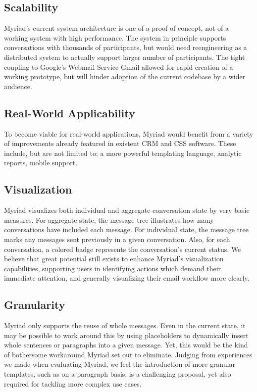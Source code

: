\subsection{Scalability}

Myriad’s current system architecture is one of a proof of concept, not of a working system with high performance. The system in principle supports conversations with thousands of participants, but would need reengineering as a distributed system to actually support larger number of participants.
The tight coupling to Google’s Webmail Service Gmail allowed for rapid creation of a working prototype, but will hinder adoption of the current codebase by a wider audience.

\subsection{Real-World Applicability}

To become viable for real-world applications, Myriad would benefit from a variety of improvements already featured in existent CRM and CSS software. These include, but are not limited to: a more powerful templating language, analytic reports, mobile support.

\subsection{Visualization}

Myriad visualizes both individual and aggregate conversation state by very basic measures. For aggregate state, the message tree illustrates how many conversations have included each message. For individual state, the message tree marks any messages sent previously in a given conversation. Also, for each conversation, a colored badge represents the conversation's current status. We believe that great potential still exists to enhance Myriad's visualization capabilities, supporting users in identifying actions which demand their immediate attention, and generally visualizing their email workflow more clearly.

\subsection{Granularity}

Myriad only supports the reuse of whole messages. Even in the current state, it may be possible to work around this by using placeholders to dynamically insert whole sentences or paragraphs into a given message. Yet, this would be the kind of bothersome workaround Myriad set out to eliminate. Judging from experiences we made when evaluating Myriad, we feel the introduction of more granular templates, such as on a paragraph basis, is a challenging proposal, yet also required for tackling more complex use cases.

